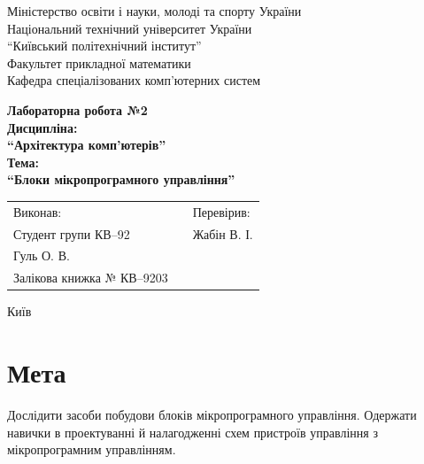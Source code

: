 \documentclass[a4paper, 10pt]{article}
\begin{document}
\begin{titlepage}
\begin{center}
\large{
Міністерство освіти і науки, молоді та спорту України\\
Національний технічний університет України\\
``Київський політехнічний інститут''\\
Факультет прикладної математики\\
Кафедра спеціалізованих комп’ютерних систем\\
}

\vfill

\large{\bf{
Лабораторна робота №2\\
Дисципліна:\\
``Архітектура комп'ютерів''\\
Тема:\\
``Блоки мікропрограмного управління''\\
}}

\vfill

\begin{table}[h]
\centering
\begin{tabular}{lp{4cm}l}
Виконав:&&Перевірив:\\
Студент групи КВ--92&&Жабін В. І.\\
Гуль О. В.&&\\
Залікова книжка № КВ--9203&&\\
\end{tabular}
\end{table}

\vfill

Київ \the\year
\end{center}
\end{titlepage}
\newpage

\section{Мета}
Дослідити засоби побудови блоків мікропрограмного управління. Одержати навички в проектуванні й налагодженні схем пристроїв управління з мікропрограмним управлінням.
\end{document}
